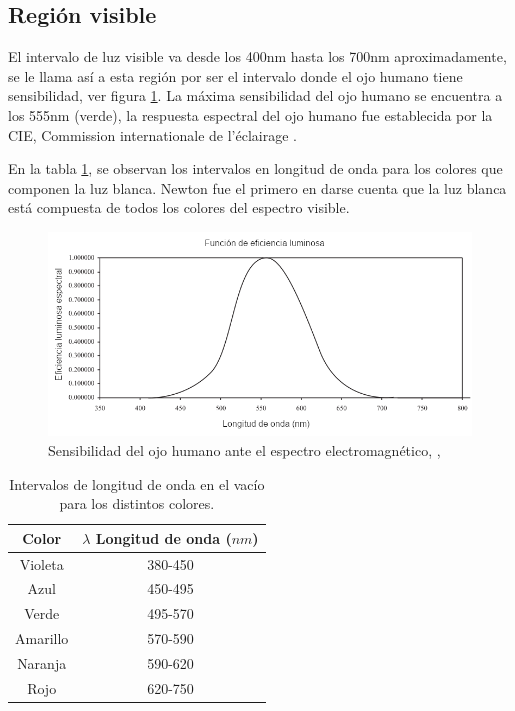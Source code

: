 \subsection{Región visible}
El intervalo de luz visible va desde los 400nm hasta los 700nm aproximadamente, se le llama así a esta región por ser el intervalo donde el ojo humano tiene sensibilidad, ver figura \ref{fig:ojohumano}. La máxima sensibilidad del ojo humano se encuentra a los 555nm (verde), la respuesta espectral del ojo humano fue establecida por la CIE, Commission internationale de l'éclairage \cite{CIE1924}.

En la tabla \ref{tabla:ojo},  se observan los intervalos en longitud de onda para los colores que componen la luz blanca.
Newton fue el primero en darse cuenta que la luz blanca está compuesta de todos los colores del espectro visible.
\begin{figure}
	\centering
	\includegraphics[width=0.8\linewidth]{Imagenes/SpectralL}
	\caption{Sensibilidad del ojo humano ante el espectro electromagnético, \cite{CRC2016}, \cite{inproceedings}}
	\label{fig:ojohumano}
\end{figure}

\begin{table}
\centering

\caption{Intervalos de longitud de onda en el vacío para los distintos colores. \cite{Bruno2005}}
\begin{tabular}{|c|c|}
	\hline 
	Color & $\lambda$ Longitud de onda ($nm$) \\ 
	\hline 
	Violeta & 380-450 \\ 
	\hline 
	Azul & 450-495  \\ 
	\hline 
	Verde & 495-570  \\ 
	\hline 
	Amarillo & 570-590 \\ 
	\hline 
	Naranja & 590-620 \\ 
	\hline 
	Rojo & 620-750 \\ 
	\hline 
\end{tabular} 
\label{tabla:ojo}		
\end{table}



